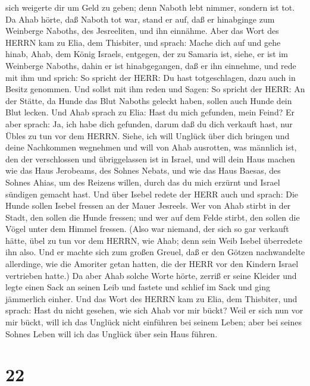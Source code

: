 sich weigerte dir um Geld zu geben; denn Naboth lebt nimmer, sondern ist
tot.  Da Ahab hörte, daß Naboth tot war, stand er auf, daß
er hinabginge zum Weinberge Naboths, des Jesreeliten, und ihn einnähme.
 Aber das Wort des HERRN kam zu Elia, dem Thisbiter, und
sprach:  Mache dich auf und gehe hinab, Ahab, dem König
Israels, entgegen, der zu Samaria ist, siehe, er ist im Weinberge
Naboths, dahin er ist hinabgegangen, daß er ihn einnehme, 
und rede mit ihm und sprich: So spricht der HERR: Du hast totgeschlagen,
dazu auch in Besitz genommen. Und sollst mit ihm reden und Sagen: So
spricht der HERR: An der Stätte, da Hunde das Blut Naboths geleckt
haben, sollen auch Hunde dein Blut lecken.  Und Ahab sprach
zu Elia: Hast du mich gefunden, mein Feind? Er aber sprach: Ja, ich habe
dich gefunden, darum daß du dich verkauft hast, nur Übles zu tun vor dem
HERRN.  Siehe, ich will Unglück über dich bringen und deine
Nachkommen wegnehmen und will von Ahab ausrotten, was männlich ist, den
der verschlossen und übriggelassen ist in Israel,  und will
dein Haus machen wie das Haus Jerobeams, des Sohnes Nebats, und wie das
Haus Baesas, des Sohnes Ahias, um des Reizens willen, durch das du mich
erzürnt und Israel sündigen gemacht hast.  Und über Isebel
redete der HERR auch und sprach: Die Hunde sollen Isebel fressen an der
Mauer Jesreels.  Wer von Ahab stirbt in der Stadt, den
sollen die Hunde fressen; und wer auf dem Felde stirbt, den sollen die
Vögel unter dem Himmel fressen.  (Also war niemand, der
sich so gar verkauft hätte, übel zu tun vor dem HERRN, wie Ahab; denn
sein Weib Isebel überredete ihn also.  Und er machte sich
zum großen Greuel, daß er den Götzen nachwandelte allerdinge, wie die
Amoriter getan hatten, die der HERR vor den Kindern Israel vertrieben
hatte.)  Da aber Ahab solche Worte hörte, zerriß er seine
Kleider und legte einen Sack an seinen Leib und fastete und schlief im
Sack und ging jämmerlich einher.  Und das Wort des HERRN
kam zu Elia, dem Thisbiter, und sprach:  Hast du nicht
gesehen, wie sich Ahab vor mir bückt? Weil er sich nun vor mir bückt,
will ich das Unglück nicht einführen bei seinem Leben; aber bei seines
Sohnes Leben will ich das Unglück über sein Haus führen.

\hypertarget{section-21}{%
\section{22}\label{section-21}}


